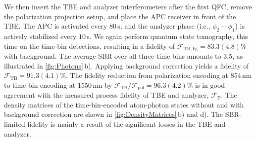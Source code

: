 \documentclass[reprint, superscriptaddress, longbibliography, floatfix, twocolumn, nofootinbib, amsmath, amssymb, aps, showkeys]{revtex4-2}
\newcommand{\CH}[1]{{\textbf{\color{violet}[#1]}}}
\begin{document}
We then insert the TBE and analyzer interferometers after the first QFC, remove the polarization projection setup, and place the APC receiver in front of the TBE. The APC is activated every $80\,$s, and the analyzer phase (i.e., $\phi_2-\phi_1$) is actively stabilized every $10\,$s. We again perform quantum state tomography, this time on the time-bin detections, resulting in a fidelity of $\mathcal{F}_\mathrm{TB,bg}=83.3(4.8)\%$ with background. The average SBR over all three time bins amounts to $3.5$, as illustrated in \autoref{fig:Photons}\,b). Applying background correction yields a fidelity of $\mathcal{F}_\mathrm{TB}=91.3(4.1)\%$. The fidelity reduction from polarization encoding at 854\,nm to time-bin encoding at 1550\,nm by $\mathcal{F}_\mathrm{TB} / \mathcal{F}_\mathrm{pol} = 96.3(4.2)\%$ is in good agreement with the measured process fidelity of TBE and analyzer, $\mathcal{F}_\mathrm{P}$. The density matrices of the time-bin-encoded atom-photon states without and with background correction are shown in \autoref{fig:DensityMatrices}$\,$b) and d). The SBR-limited fidelity is mainly a result of the significant losses in the TBE and analyzer.


\end{document}
